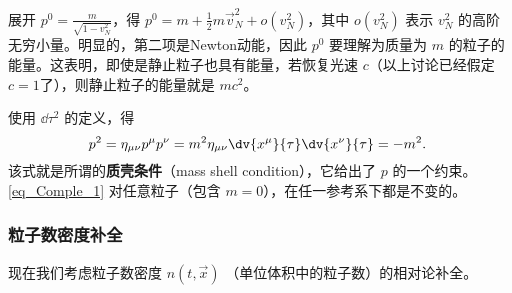 展开 $p^0=\frac{m}{\sqrt{1-v_N^2}}$，得 $p^0=m+\frac{1}{2}m\vec v_N^2+o(v_N^2)$，其中 $o(v_N^2)$ 表示 $v_N^2$ 的高阶无穷小量。明显的，第二项是Newton动能，因此 $p^0$ 要理解为质量为 $m$ 的粒子的能量。这表明，即使是静止粒子也具有能量，若恢复光速 $c$（以上讨论已经假定 $c=1$了），则静止粒子的能量就是 $mc^2$。

使用 $\dd\tau^2$ 的定义，得
\begin{equation}\label{eq_Comple_1}
p^2=\eta_{\mu\nu}p^\mu p^\nu=m^2\eta_{\mu\nu}\dv{x^\mu}{\tau}\dv{x^\nu}{\tau}=-m^2.~
\end{equation}
该式就是所谓的\textbf{质壳条件}（mass shell condition），它给出了 $p$ 的一个约束。\autoref{eq_Comple_1} 对任意粒子（包含 $m=0$），在任一参考系下都是不变的。


\subsubsection{粒子数密度补全}

现在我们考虑粒子数密度 $n(t,\vec x)$ （单位体积中的粒子数）的相对论补全。


















